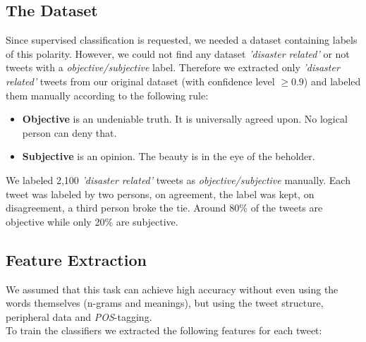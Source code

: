 \documentclass[letterpaper,twocolumn,10pt]{article}
\begin{document}
\subsection{The Dataset}
Since supervised classification is requested, we needed a dataset containing labels of this polarity. However, we could not find any dataset \textit{'disaster related'} or not tweets with a \textit{objective/subjective} label. Therefore we extracted only \textit{'disaster related'} tweets from our original dataset (with confidence level $ \ge 0.9 $) and labeled them manually according to the following rule:
\begin{itemize}
	\item \textbf{Objective} is an undeniable truth. It is universally agreed upon. No logical person can deny that.
	\item \textbf{Subjective} is an opinion. The beauty is in the eye of the beholder.
\end{itemize}
We labeled 2,100 \textit{'disaster related'} tweets as \textit{objective/subjective} manually. Each tweet was labeled by two persons, on agreement, the label was kept, on disagreement, a third person broke the tie. Around 80\% of the tweets are objective while only 20\% are subjective.

\subsection{Feature Extraction}

We assumed that this task can achieve high accuracy without even using the words themselves (n-grams and meanings), but using the tweet structure, peripheral data and \textit{POS}-tagging. \\
To train the classifiers we extracted the following features for each tweet:
\end{document}
